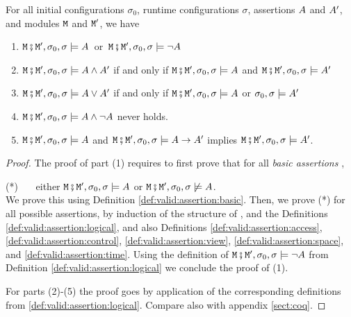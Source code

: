 \begin{lemma}
\label{lemma:classic}
For all initial configurations $\sigma_0$, runtime configurations $\sigma$,    assertions $\A$ and $\A'$, and modules $\M$  and $\M'$, we have
\begin{enumerate}
\item
$\M\mkpair \M', \sigma_0,\sigma \models \A$\ or\ $\M\mkpair \M', \sigma_0,\sigma \models \neg\A$
\item
$\M\mkpair \M', \sigma_0,\sigma  \models \A \wedge \A'$ \SP if and only if \SP $\M\mkpair \M', \sigma_0,\sigma \models \A$ and $\M\mkpair \M', \sigma_0,\sigma  \models \A'$
\item
$\M\mkpair \M', \sigma_0,\sigma  \models \A \vee \A'$ \SP if and only if \SP $\M\mkpair \M', \sigma_0,\sigma  \models \A$ or  $\sigma_0,\sigma \models \A'$
\item
$\M\mkpair \M', \sigma_0,\sigma  \models \A \wedge \neg\A$ never holds.
\item
$\M\mkpair \M', \sigma_0,\sigma  \models \A$ and  $\M\mkpair \M', \sigma_0,\sigma  \models \A \rightarrow \A'$  implies
$\M\mkpair \M', \sigma_0,\sigma  \models \A '$.
\end{enumerate}
\end{lemma}
\begin{proof}  The proof of part (1) requires to first prove that for all \emph{basic assertions} \A, \\
\strut \hspace{1.1cm} (*) \ \ \ either $\M\mkpair \M', \sigma_0,\sigma  \models \A$
or $\M\mkpair \M', \sigma_0,\sigma  \not\models \A$.\\
We prove this using Definition \ref{def:valid:assertion:basic}.
 Then, we prove (*) for all
possible assertions, by induction of the structure of \A, and the Definitions 
 \ref{def:valid:assertion:logical},
 and also Definitions
  \ref{def:valid:assertion:access}, \ref{def:valid:assertion:control}, \ref{def:valid:assertion:view},  
 \ref{def:valid:assertion:space}, and \ref{def:valid:assertion:time}.
Using the definition of $\M\mkpair \M', \sigma_0,\sigma \models \neg\A$ from Definition  \ref{def:valid:assertion:logical} we conclude the proof of (1).

For parts  (2)-(5) the proof goes by application of the corresponding definitions from \ref{def:valid:assertion:logical}.
Compare also with appendix \ref{sect:coq}.

\end{proof}


